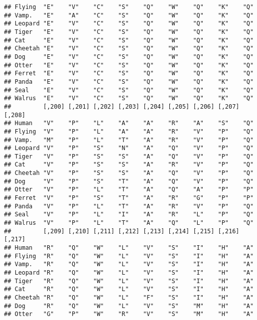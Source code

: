 \documentclass[]{article}
\begin{document}
\begin{verbatim}
## Flying  "E"    "V"    "C"    "S"    "Q"    "W"    "Q"    "K"    "Q"   
## Vamp.   "E"    "A"    "C"    "S"    "Q"    "W"    "Q"    "K"    "Q"   
## Leopard "E"    "V"    "C"    "S"    "Q"    "W"    "Q"    "K"    "Q"   
## Tiger   "E"    "V"    "C"    "S"    "Q"    "W"    "Q"    "K"    "Q"   
## Cat     "E"    "V"    "C"    "S"    "Q"    "W"    "Q"    "K"    "Q"   
## Cheetah "E"    "V"    "C"    "S"    "Q"    "W"    "Q"    "K"    "Q"   
## Dog     "E"    "V"    "C"    "S"    "Q"    "W"    "Q"    "K"    "Q"   
## Otter   "E"    "V"    "C"    "S"    "Q"    "W"    "Q"    "K"    "Q"   
## Ferret  "E"    "V"    "C"    "S"    "Q"    "W"    "Q"    "K"    "Q"   
## Panda   "E"    "V"    "C"    "S"    "Q"    "W"    "Q"    "K"    "Q"   
## Seal    "E"    "V"    "C"    "S"    "Q"    "W"    "Q"    "K"    "Q"   
## Walrus  "E"    "V"    "C"    "S"    "Q"    "W"    "Q"    "K"    "Q"   
##         [,200] [,201] [,202] [,203] [,204] [,205] [,206] [,207] [,208]
## Human   "V"    "P"    "L"    "A"    "A"    "R"    "A"    "S"    "Q"   
## Flying  "V"    "P"    "L"    "A"    "A"    "R"    "V"    "P"    "Q"   
## Vamp.   "M"    "P"    "L"    "T"    "A"    "R"    "V"    "P"    "Q"   
## Leopard "V"    "P"    "S"    "N"    "A"    "Q"    "V"    "P"    "Q"   
## Tiger   "V"    "P"    "S"    "S"    "A"    "Q"    "V"    "P"    "Q"   
## Cat     "V"    "P"    "S"    "S"    "A"    "R"    "V"    "P"    "Q"   
## Cheetah "V"    "P"    "S"    "S"    "A"    "Q"    "V"    "P"    "Q"   
## Dog     "V"    "P"    "S"    "T"    "A"    "Q"    "V"    "P"    "Q"   
## Otter   "V"    "P"    "L"    "T"    "A"    "Q"    "A"    "P"    "P"   
## Ferret  "V"    "P"    "S"    "T"    "A"    "R"    "G"    "P"    "P"   
## Panda   "V"    "P"    "L"    "T"    "A"    "R"    "V"    "P"    "Q"   
## Seal    "V"    "P"    "L"    "I"    "A"    "R"    "L"    "P"    "Q"   
## Walrus  "V"    "P"    "L"    "T"    "A"    "Q"    "L"    "P"    "Q"   
##         [,209] [,210] [,211] [,212] [,213] [,214] [,215] [,216] [,217]
## Human   "R"    "Q"    "W"    "L"    "V"    "S"    "I"    "H"    "A"   
## Flying  "R"    "Q"    "W"    "L"    "V"    "S"    "I"    "H"    "A"   
## Vamp.   "R"    "Q"    "W"    "L"    "V"    "S"    "I"    "H"    "A"   
## Leopard "R"    "Q"    "W"    "L"    "V"    "S"    "I"    "H"    "A"   
## Tiger   "R"    "Q"    "W"    "L"    "V"    "S"    "I"    "H"    "A"   
## Cat     "R"    "Q"    "W"    "L"    "V"    "S"    "I"    "H"    "A"   
## Cheetah "R"    "Q"    "W"    "L"    "F"    "S"    "I"    "H"    "A"   
## Dog     "R"    "Q"    "W"    "L"    "V"    "S"    "M"    "H"    "A"   
## Otter   "G"    "P"    "W"    "R"    "V"    "S"    "M"    "H"    "A"   

\end{verbatim}
\end{document}
